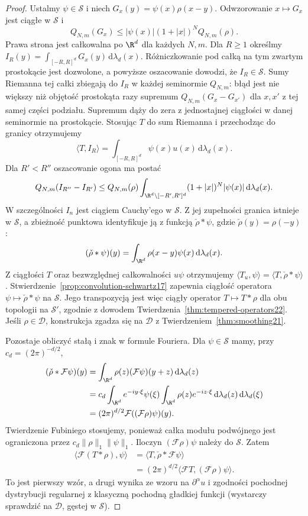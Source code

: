 \begin{proof}
Ustalmy $\psi\in\mathcal S$ i niech $G_x(y)=
\psi(x)\rho(x-y)$. Odwzorowanie $x\mapsto G_x$
jest ciągłe w $\mathcal S$ i
\[
 Q_{N,m}(G_x)\le |\psi(x)|(1+|x|)^N Q_{N,m}(\rho).
\]
Prawa strona jest całkowalna po $\R^d$ dla każdych $N,m$.
Dla $R\ge1$ określmy $I_R(y)=\int_{[-R,R]^d}G_x(y)
\,\mathrm d\lambda_d(x)$. Różniczkowanie pod całką na
tym zwartym prostokącie jest dozwolone, a powyższe
oszacowanie dowodzi, że $I_R\in\mathcal S$.
Sumy Riemanna tej całki zbiegają do $I_R$ w każdej
seminormie $Q_{N,m}$: błąd jest nie większy niż
objętość prostokąta razy supremum
$Q_{N,m}(G_x-G_{x'})$ dla $x,x'$ z tej samej części
podziału. Supremum dąży do zera z jednostajnej
ciągłości w danej seminormie na prostokącie.
Stosując $T$ do sum Riemanna i przechodząc do granicy
otrzymujemy
\[
 \langle T,I_R\rangle=
 \int_{[-R,R]^d}\psi(x)u(x)\,\mathrm d\lambda_d(x).
\]
Dla $R'<R''$ oszacowanie ogona ma postać
\[
 Q_{N,m}(I_{R''}-I_{R'})
 \le Q_{N,m}(\rho)
 \int_{\R^d\setminus[-R',R']^d}
 (1+|x|)^N|\psi(x)|\,\mathrm d\lambda_d(x).
\]
W szczególności $I_n$ jest ciągiem Cauchy'ego w $\mathcal S$.
Z jej zupełności granica istnieje w $\mathcal S$, a
zbieżność punktowa identyfikuje ją z funkcją
$\check\rho*\psi$, gdzie $\check\rho(y)=\rho(-y)$:
\[
 (\check\rho*\psi)(y)=
 \int_{\R^d}\rho(x-y)\psi(x)\,\mathrm d\lambda_d(x).
\]
Z ciągłości $T$ oraz bezwzględnej całkowalności
$u\psi$ otrzymujemy
$\langle T_u,\psi\rangle=\langle T,\check\rho*\psi\rangle$.
Stwierdzenie~\ref{prop:convolution-schwartz17} zapewnia
ciągłość operatora $\psi\mapsto\check\rho*\psi$ na
$\mathcal S$. Jego transpozycją jest więc ciągły
operator $T\mapsto T*\rho$ dla obu topologii na
$\mathcal S'$, zgodnie z dowodem
Twierdzenia~\ref{thm:tempered-operators22}.
Jeśli $\rho\in\mathcal D$, konstrukcja zgadza się na
$\mathcal D$ z Twierdzeniem~\ref{thm:smoothing21}.

Pozostaje obliczyć stałą i znak w formule Fouriera.
Dla $\psi\in\mathcal S$ mamy, przy $c_d=(2\pi)^{-d/2}$,
\[
\begin{aligned}
(\check\rho*\mathcal F\psi)(y)
 &=\int_{\R^d}\rho(z)(\mathcal F\psi)(y+z)
 \,\mathrm d\lambda_d(z)\\
 &=c_d\int_{\R^d}e^{-iy\cdot\xi}\psi(\xi)
 \int_{\R^d}\rho(z)e^{-iz\cdot\xi}\,\mathrm d\lambda_d(z)
 \,\mathrm d\lambda_d(\xi)\\
 &=(2\pi)^{d/2}\mathcal F((\mathcal F\rho)\psi)(y).
\end{aligned}
\]
Twierdzenie Fubiniego stosujemy, ponieważ całka
modułu podwójnego jest ograniczona przez
$c_d\|\rho\|_1\|\psi\|_1$. Iloczyn
$(\mathcal F\rho)\psi$ należy do $\mathcal S$.
Zatem
\[
\begin{aligned}
\langle\mathcal F(T*\rho),\psi\rangle
&=\langle T,\check\rho*\mathcal F\psi\rangle\\
&=(2\pi)^{d/2}\langle\mathcal FT,
 (\mathcal F\rho)\psi\rangle.
\end{aligned}
\]
To jest pierwszy wzór, a drugi wynika ze wzoru na
$\partial^\alpha u$ i zgodności pochodnej dystrybucji
regularnej z klasyczną pochodną gładkiej funkcji
(wystarczy sprawdzić na $\mathcal D$, gęstej w $\mathcal S$).
\end{proof}

